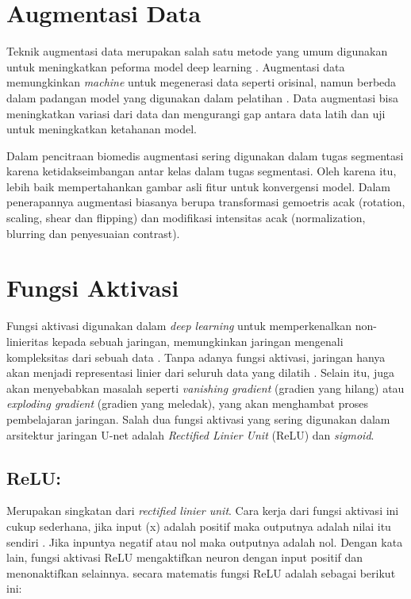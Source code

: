 \section{Augmentasi Data}

\noindent Teknik augmentasi data merupakan salah satu metode yang umum digunakan untuk meningkatkan peforma model deep learning \cite{minaee_image_2020}. Augmentasi data memungkinkan \textit{machine} untuk megenerasi data seperti orisinal, namun berbeda dalam padangan model yang digunakan dalam pelatihan \cite{huang_fully_2022}. Data augmentasi bisa meningkatkan variasi dari data dan mengurangi gap antara data latih dan uji untuk meningkatkan ketahanan model.

\noindent Dalam pencitraan biomedis augmentasi sering digunakan dalam tugas segmentasi karena ketidakseimbangan antar kelas dalam tugas segmentasi. Oleh karena itu, lebih baik mempertahankan gambar asli fitur untuk konvergensi model. Dalam penerapannya augmentasi biasanya berupa transformasi gemoetris acak (rotation, scaling, shear dan flipping) dan modifikasi intensitas acak (normalization, blurring dan penyesuaian contrast)\cite{minaee_image_2020}.


\section{Fungsi Aktivasi}

\noindent Fungsi aktivasi digunakan dalam \textit{deep learning} untuk memperkenalkan non-linieritas kepada sebuah jaringan, memungkinkan jaringan mengenali kompleksitas dari sebuah data \cite{younisse_fine-tuning_2023,heaton_ian_2018}. Tanpa adanya fungsi aktivasi, jaringan hanya akan menjadi representasi linier dari seluruh data yang dilatih \cite{chiang_activation_2023}. Selain itu, juga akan menyebabkan masalah seperti \textit{vanishing gradient} (gradien yang hilang) atau \textit{exploding gradient} (gradien yang meledak), yang akan menghambat proses pembelajaran jaringan. Salah dua fungsi aktivasi yang sering digunakan dalam arsitektur jaringan U-net adalah \textit{Rectified Linier Unit} (ReLU) dan \textit{sigmoid}. %

\subsection{ReLU:}
Merupakan singkatan dari \textit{rectified linier unit}. Cara kerja dari fungsi aktivasi ini cukup sederhana, jika input (x) adalah positif maka outputnya adalah nilai itu sendiri \cite{younisse_fine-tuning_2023}. Jika inpuntya negatif atau nol maka outputnya adalah nol. Dengan kata lain, fungsi aktivasi ReLU mengaktifkan neuron dengan input positif dan menonaktifkan selainnya. secara matematis fungsi ReLU adalah sebagai berikut ini: 

